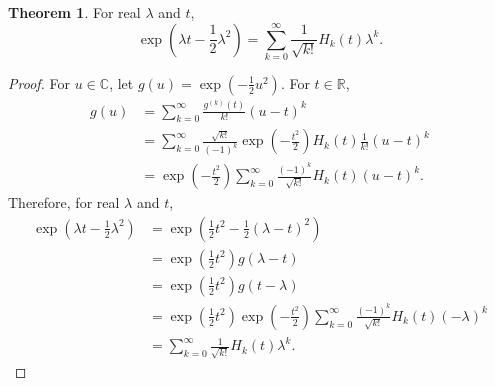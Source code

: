 \documentclass{article}
\theoremstyle{definition}
\newtheorem{theorem}{Theorem}
\theoremstyle{definition}
\begin{document}
\begin{theorem}
For real $\lambda$ and $t$,
\[
\exp\left(\lambda t-\frac{1}{2}\lambda^2\right) = \sum_{k=0}^\infty  \frac{1}{\sqrt{k!}} H_k(t) \lambda^k.
\]
\label{generating}
\end{theorem}
\begin{proof}
For $u \in \mathbb{C}$, let $g(u)=\exp\left(-\frac{1}{2}u^2 \right)$. For $t \in \mathbb{R}$,
\begin{align*}
g(u) &= \sum_{k=0}^\infty \frac{g^{(k)}(t)}{k!} (u-t)^k\\
&= \sum_{k=0}^\infty \frac{\sqrt{k!}}{(-1)^k} \exp\left( - \frac{t^2}{2} \right) H_k(t) \frac{1}{k!} (u-t)^k\\
&= \exp\left( - \frac{t^2}{2} \right) \sum_{k=0}^\infty \frac{(-1)^k}{\sqrt{k!}} H_k(t) (u-t)^k.
\end{align*}
Therefore, for real $\lambda$ and $t$,
\begin{align*}
\exp\left(\lambda t-\frac{1}{2}\lambda^2\right)&=\exp\left(\frac{1}{2}t^2 - \frac{1}{2}(\lambda-t)^2 \right)\\
&=\exp\left(\frac{1}{2}t^2\right) g(\lambda-t)\\
&=\exp\left(\frac{1}{2}t^2\right) g(t-\lambda)\\
&=\exp\left(\frac{1}{2}t^2\right)  \exp\left( - \frac{t^2}{2} \right) \sum_{k=0}^\infty \frac{(-1)^k}{\sqrt{k!}} H_k(t) (-\lambda)^k\\
&=\sum_{k=0}^\infty  \frac{1}{\sqrt{k!}} H_k(t) \lambda^k.
\end{align*}
\end{proof}
\end{document}
